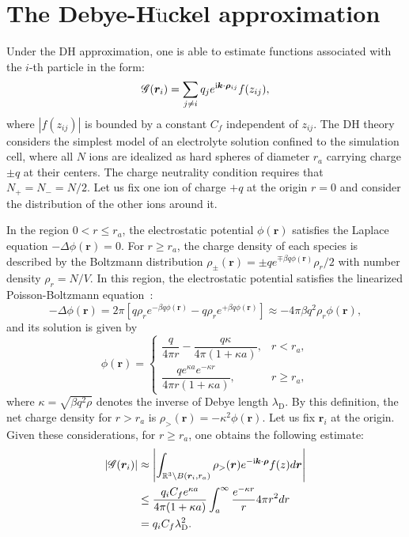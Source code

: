 \section{The Debye-H$\ddot{\text{u}}$ckel approximation}\label{app::Debye}
Under the DH approximation, one is able to estimate functions associated with the $i$-th particle in the form:
\begin{equation}
	\mathscr{G}(\bm{r}_i)=\sum_{j\neq i}q_{j}e^{\mathrm{i} \bm{k}\cdot\bm{\rho}_{ij}}f(z_{ij}),
\end{equation}
where $|f(z_{ij})|$ is bounded by a constant $C_f$ independent of $z_{ij}$. The DH theory considers the simplest model of an electrolyte solution confined to the simulation cell, where all $N$ ions are idealized as hard spheres of diameter $r_{a}$ carrying charge $\pm q$ at their centers. The charge neutrality condition requires that $N_+=N_-=N/2$. Let us fix one ion of charge $+q$ at the origin $r=0$ and consider the distribution of the other ions around it.

In the region $0<r\leq r_{a}$, the electrostatic potential $\phi(\bm{r})$ satisfies the Laplace equation $-\Delta\phi(\bm{r})=0$. For $r\geq r_{a}$, the charge density of each species is described by the Boltzmann distribution $\rho_{\pm}(\bm{r})=\pm qe^{\mp\beta q\phi(\bm{r})}\rho_r/2$ with number density $\rho_r=N/V$. In this region, the electrostatic potential satisfies the linearized Poisson-Boltzmann equation~\cite{levin2002electrostatic}:
\begin{equation}
	-\Delta \phi(\bm{r})=2\pi\left[q \rho_r e^{-\beta q\phi(\bm{r})}-q\rho_r e^{+\beta q\phi(\bm{r})}\right]\approx -4\pi \beta q^2\rho_r\phi(\bm{r}),
\end{equation}
and its solution is given by
\begin{equation}
	\phi(\bm{r})=\begin{cases}
		\dfrac{q}{4\pi r}-\dfrac{q\kappa}{4\pi (1+\kappa a)},& r<r_{a},\\[1em]
		\dfrac{qe^{\kappa a}e^{-\kappa r}}{4\pi r(1+\kappa a)},&r\geq r_{a},
	\end{cases}
\end{equation}
where $\kappa=\sqrt{\beta q^2\rho}$ denotes the inverse of Debye length $\lambda_{\text{D}}$. By this definition, the net charge density for $r>r_{a}$ is $\rho_>(\bm{r})=-\kappa^2\phi(\bm{r})$. Let us fix $\bm{r}_i$ at the origin. Given these considerations, for $r\geq r_a$, one obtains the following estimate:
\begin{equation}\label{eq::E.4}
	\begin{split}
		|\mathscr{G}(\bm{r}_i)|&\approx \left|\int_{\mathbb{R}^3\backslash B(\bm{r}_{i}, r_a)}\rho_>(\bm{r})e^{-\mathrm{i} \bm{k}\cdot\bm{\rho}}f(z)d\bm{r}\right|\\
		&\leq \frac{q_iC_fe^{\kappa a}}{4\pi(1+\kappa a)}\int_{a}^{\infty}\frac{e^{-\kappa r}}{r}4\pi r^2dr\\
		&=q_iC_f\lambda_{\text{D}}^2.
	\end{split}
\end{equation}

